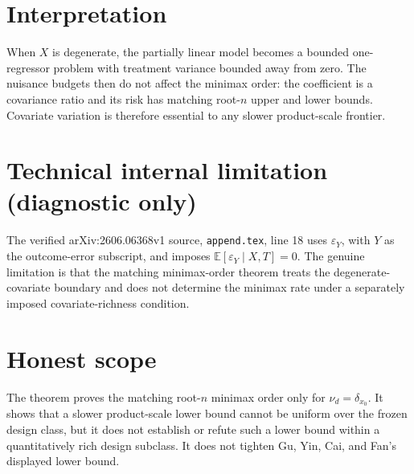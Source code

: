 \documentclass{article}
\begin{document}
\section{Interpretation}

When \(X\) is degenerate, the partially linear model becomes a bounded one-regressor problem with treatment variance bounded away from zero. The nuisance budgets then do not affect the minimax order: the coefficient is a covariance ratio and its risk has matching root-\(n\) upper and lower bounds. Covariate variation is therefore essential to any slower product-scale frontier.

\section*{Technical internal limitation (diagnostic only)}

The verified arXiv:2606.06368v1 source, \texttt{append.tex}, line 18 uses \(\varepsilon_Y\), with \(Y\) as the outcome-error subscript, and imposes \(\mathbb E[\varepsilon_Y\mid X,T]=0\). The genuine limitation is that the matching minimax-order theorem treats the degenerate-covariate boundary and does not determine the minimax rate under a separately imposed covariate-richness condition.

\section{Honest scope}

The theorem proves the matching root-\(n\) minimax order only for \(\nu_d=\delta_{x_0}\). It shows that a slower product-scale lower bound cannot be uniform over the frozen design class, but it does not establish or refute such a lower bound within a quantitatively rich design subclass. It does not tighten Gu, Yin, Cai, and Fan's displayed lower bound.
\end{document}
